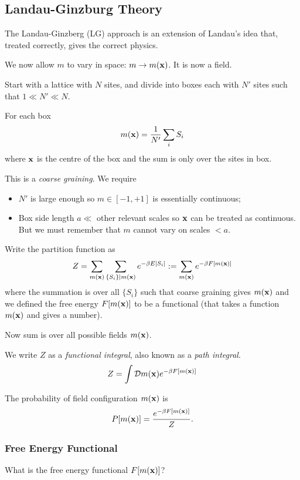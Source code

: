 \documentclass[a4paper,11pt]{article}
\begin{document}
	\subsection{Landau-Ginzburg Theory} 

	The Landau-Ginzberg (LG) approach is an extension of Landau's idea that, treated correctly, gives the correct physics.

	We now allow $m$ to vary in space: $m \to m(\vb x)$. It is now a field.

	Start with a lattice with $N$ sites, and divide into boxes each with $N'$ sites such that $1 \ll N' \ll N$.
	

	For each box
	\[
		m(\vb x) = \frac{1}{N'} \sum_i S_i
	\]
	where $\vb x$ is the centre of the box and the sum is only over the sites in box.

	This is a \emph{coarse graining}. We require
	\begin{itemize}
		\item $N'$ is large enough so $m \in [-1,+1]$ is essentially continuous;
		\item Box side length $a \ll$ other relevant scales so $\vb x$ can be treated as continuous. But we must remember that $m$ cannot vary on scales $<a$.
	\end{itemize}

	Write the partition function as 
	\[
		Z = \sum _{m(\vb x)} \sum _{\{S_i\}|m(\vb x)} e ^{- \beta E[S_i]} := \sum _{m(\vb x)} e ^{-\beta F[m(\vb x)]}
	\]
	where the summation is over all $\{S_i\}$ such that coarse graining gives $m(\vb x)$ and we defined the free energy $F[m(\vb x)]$ to be a functional (that takes a function $m(\vb x)$ and gives a number).

	Now sum is over all possible fields $m(\vb x)$.

	We write $Z$ as a \emph{functional integral}, also known as a \emph{path integral}.
	\[
		Z = \int \mathcal{D} m(\vb x) e ^{-\beta F[m(\vb x)]}
	\]
	
	The probability of field configuration $m(\vb x)$ is
	\[
		P[m(\vb x)] = \frac{e ^{- \beta F[m(\vb x)]}}{Z}.
	\]
	
	\subsubsection{Free Energy Functional}

	What is the free energy functional $F[m(\vb x)]$?
\end{document}
